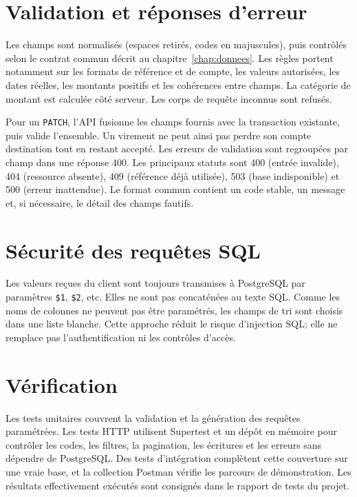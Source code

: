 \section{Validation et réponses d'erreur}
Les champs sont normalisés (espaces retirés, codes en majuscules), puis contrôlés selon le contrat
commun décrit au chapitre~\ref{chap:donnees}. Les règles portent notamment sur les formats de
référence et de compte, les valeurs autorisées, les dates réelles, les montants positifs et les
cohérences entre champs. La catégorie de montant est calculée côté serveur. Les corps de requête
inconnus sont refusés.

Pour un \texttt{PATCH}, l'API fusionne les champs fournis avec la transaction existante, puis valide
l'ensemble. Un virement ne peut ainsi pas perdre son compte destination tout en restant accepté.
Les erreurs de validation sont regroupées par champ dans une réponse 400. Les principaux statuts
sont 400 (entrée invalide), 404 (ressource absente), 409 (référence déjà utilisée), 503 (base
indisponible) et 500 (erreur inattendue). Le format commun contient un code stable, un message et,
si nécessaire, le détail des champs fautifs.

\section{Sécurité des requêtes SQL}
Les valeurs reçues du client sont toujours transmises à PostgreSQL par paramètres \texttt{\$1},
\texttt{\$2}, etc. Elles ne sont pas concaténées au texte SQL. Comme les noms de colonnes ne
peuvent pas être paramétrés, les champs de tri sont choisis dans une liste blanche. Cette approche
réduit le risque d'injection SQL; elle ne remplace pas l'authentification ni les contrôles d'accès.

\section{Vérification}
Les tests unitaires couvrent la validation et la génération des requêtes paramétrées. Les tests
HTTP utilisent Supertest et un dépôt en mémoire pour contrôler les codes, les filtres, la
pagination, les écritures et les erreurs sans dépendre de PostgreSQL. Des tests d'intégration
complètent cette couverture sur une vraie base, et la collection Postman vérifie les parcours de
démonstration. Les résultats effectivement exécutés sont consignés dans le rapport de tests du
projet.